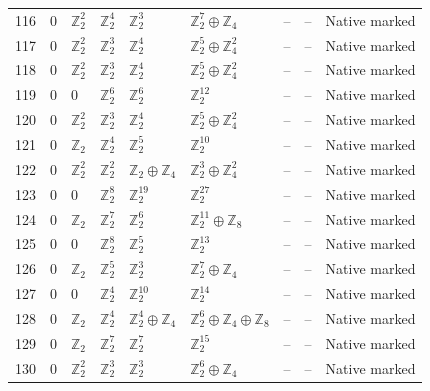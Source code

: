 \documentclass[10pt]{article}
\begin{document}
\begin{longtable}{r|lllll|rrl}
116 & $0$ & $\mathbb{Z}_{2}^{2}$ & $\mathbb{Z}_{2}^{4}$ & $\mathbb{Z}_{2}^{3}$ & $\mathbb{Z}_{2}^{7}\oplus \mathbb{Z}_{4}$ & -- & -- & Native marked\\
117 & $0$ & $\mathbb{Z}_{2}^{2}$ & $\mathbb{Z}_{2}^{3}$ & $\mathbb{Z}_{2}^{4}$ & $\mathbb{Z}_{2}^{5}\oplus \mathbb{Z}_{4}^{2}$ & -- & -- & Native marked\\
118 & $0$ & $\mathbb{Z}_{2}^{2}$ & $\mathbb{Z}_{2}^{3}$ & $\mathbb{Z}_{2}^{4}$ & $\mathbb{Z}_{2}^{5}\oplus \mathbb{Z}_{4}^{2}$ & -- & -- & Native marked\\
119 & $0$ & $0$ & $\mathbb{Z}_{2}^{6}$ & $\mathbb{Z}_{2}^{6}$ & $\mathbb{Z}_{2}^{12}$ & -- & -- & Native marked\\
120 & $0$ & $\mathbb{Z}_{2}^{2}$ & $\mathbb{Z}_{2}^{3}$ & $\mathbb{Z}_{2}^{4}$ & $\mathbb{Z}_{2}^{5}\oplus \mathbb{Z}_{4}^{2}$ & -- & -- & Native marked\\
121 & $0$ & $\mathbb{Z}_{2}$ & $\mathbb{Z}_{2}^{4}$ & $\mathbb{Z}_{2}^{5}$ & $\mathbb{Z}_{2}^{10}$ & -- & -- & Native marked\\
122 & $0$ & $\mathbb{Z}_{2}^{2}$ & $\mathbb{Z}_{2}^{2}$ & $\mathbb{Z}_{2}\oplus \mathbb{Z}_{4}$ & $\mathbb{Z}_{2}^{3}\oplus \mathbb{Z}_{4}^{2}$ & -- & -- & Native marked\\
123 & $0$ & $0$ & $\mathbb{Z}_{2}^{8}$ & $\mathbb{Z}_{2}^{19}$ & $\mathbb{Z}_{2}^{27}$ & -- & -- & Native marked\\
124 & $0$ & $\mathbb{Z}_{2}$ & $\mathbb{Z}_{2}^{7}$ & $\mathbb{Z}_{2}^{6}$ & $\mathbb{Z}_{2}^{11}\oplus \mathbb{Z}_{8}$ & -- & -- & Native marked\\
125 & $0$ & $0$ & $\mathbb{Z}_{2}^{8}$ & $\mathbb{Z}_{2}^{5}$ & $\mathbb{Z}_{2}^{13}$ & -- & -- & Native marked\\
126 & $0$ & $\mathbb{Z}_{2}$ & $\mathbb{Z}_{2}^{5}$ & $\mathbb{Z}_{2}^{3}$ & $\mathbb{Z}_{2}^{7}\oplus \mathbb{Z}_{4}$ & -- & -- & Native marked\\
127 & $0$ & $0$ & $\mathbb{Z}_{2}^{4}$ & $\mathbb{Z}_{2}^{10}$ & $\mathbb{Z}_{2}^{14}$ & -- & -- & Native marked\\
128 & $0$ & $\mathbb{Z}_{2}$ & $\mathbb{Z}_{2}^{4}$ & $\mathbb{Z}_{2}^{4}\oplus \mathbb{Z}_{4}$ & $\mathbb{Z}_{2}^{6}\oplus \mathbb{Z}_{4}\oplus \mathbb{Z}_{8}$ & -- & -- & Native marked\\
129 & $0$ & $\mathbb{Z}_{2}$ & $\mathbb{Z}_{2}^{7}$ & $\mathbb{Z}_{2}^{7}$ & $\mathbb{Z}_{2}^{15}$ & -- & -- & Native marked\\
130 & $0$ & $\mathbb{Z}_{2}^{2}$ & $\mathbb{Z}_{2}^{3}$ & $\mathbb{Z}_{2}^{3}$ & $\mathbb{Z}_{2}^{6}\oplus \mathbb{Z}_{4}$ & -- & -- & Native marked\\

\end{longtable}
\end{document}

